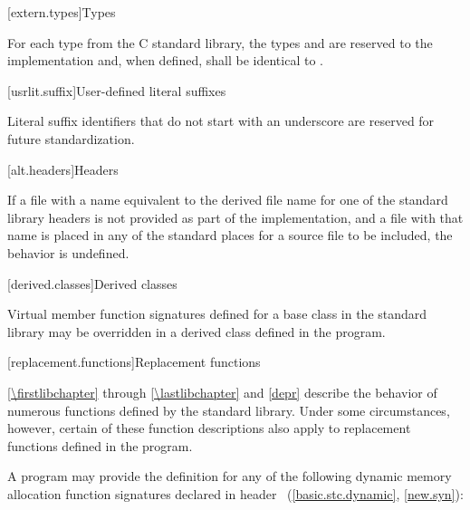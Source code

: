 [extern.types]{Types}

\pnum
For each type  from the C standard library,
the types
and
are reserved to the implementation and, when defined,
shall be identical to
.

[usrlit.suffix]{User-defined literal suffixes}

\pnum
Literal suffix identifiers that do not start with an underscore are reserved for future standardization.

[alt.headers]{Headers}

\pnum
If a file with a name
equivalent to the derived file name for one of the \Cpp{} standard library headers
is not provided as part of the implementation, and a file with that name
is placed in any of the standard places for a source file to be included,
the behavior is undefined.%
%

[derived.classes]{Derived classes}

\pnum
Virtual member function signatures defined
%
for a base class in the \Cpp{} standard
%
%
library may be overridden in a derived class defined in the program.

[replacement.functions]{Replacement functions}

\pnum
{}%
\ref{\firstlibchapter} through \ref{\lastlibchapter} and \ref{depr}
describe the behavior of numerous functions defined by
the \Cpp{} standard library.
Under some circumstances,
%
however, certain of these function descriptions also apply to replacement functions defined
in the program.

\pnum
A \Cpp{} program may provide the definition for any of the following
dynamic memory allocation function signatures declared in header
~(\ref{basic.stc.dynamic}, \ref{new.syn}):

